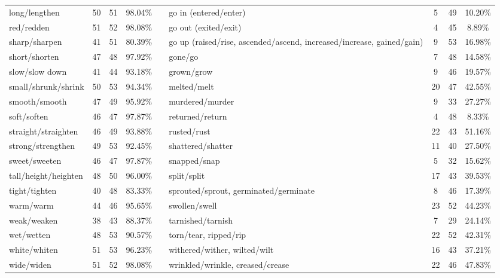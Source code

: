 \begin{tabular}{p{3cm}ccccp{3cm}ccc}
long/lengthen & 50 & 51 & 98.04\% & & go in (entered/enter) & 5 & 49 & 10.20\% \\
red/redden & 51 & 52 & 98.08\% & & go out (exited/exit) & 4 & 45 & 8.89\% \\
sharp/sharpen & 41 & 51 & 80.39\% & & go up (raised/rise, ascended/ascend, increased/increase, gained/gain) & 9 & 53 & 16.98\% \\
short/shorten & 47 & 48 & 97.92\% & & gone/go & 7 & 48 & 14.58\% \\
slow/slow down & 41 & 44 & 93.18\% & & grown/grow & 9 & 46 & 19.57\% \\
small/shrunk/shrink & 50 & 53 & 94.34\% & & melted/melt & 20 & 47 & 42.55\% \\
smooth/smooth & 47 & 49 & 95.92\% & & murdered/murder & 9 & 33 & 27.27\% \\
soft/soften & 46 & 47 & 97.87\% & & returned/return & 4 & 48 & 8.33\% \\
straight/straighten & 46 & 49 & 93.88\% & & rusted/rust & 22 & 43 & 51.16\% \\
strong/strengthen & 49 & 53 & 92.45\% & & shattered/shatter & 11 & 40 & 27.50\% \\
sweet/sweeten & 46 & 47 & 97.87\% & & snapped/snap & 5 & 32 & 15.62\% \\
tall/height/heighten & 48 & 50 & 96.00\% & & split/split & 17 & 43 & 39.53\% \\
tight/tighten & 40 & 48 & 83.33\% & & sprouted/sprout, germinated/germinate & 8 & 46 & 17.39\% \\
warm/warm & 44 & 46 & 95.65\% & & swollen/swell & 23 & 52 & 44.23\% \\
weak/weaken & 38 & 43 & 88.37\% & & tarnished/tarnish & 7 & 29 & 24.14\% \\
wet/wetten & 48 & 53 & 90.57\% & & torn/tear, ripped/rip & 22 & 52 & 42.31\% \\
white/whiten & 51 & 53 & 96.23\% & & withered/wither, wilted/wilt & 16 & 43 & 37.21\% \\
wide/widen & 51 & 52 & 98.08\% & & wrinkled/wrinkle, creased/crease & 22 & 46 & 47.83\%
\end{tabular}